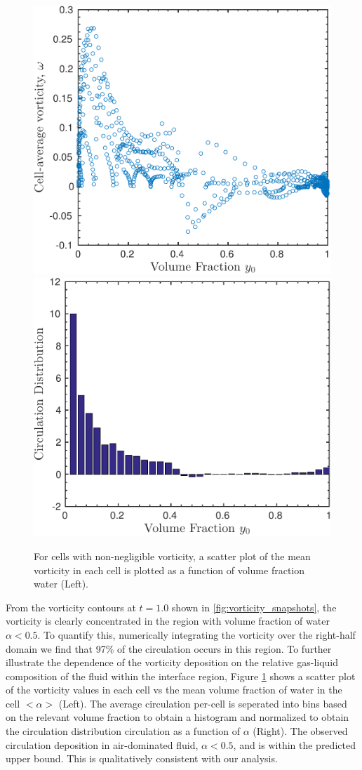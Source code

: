 \begin{figure}[h]
  \centering
  \includegraphics[width=.48\textwidth]{./figs/lung_figs/vorticity_vs_y0} \hfill
  \includegraphics[width=.48\textwidth]{./figs/lung_figs/circ_y0_dist2}
  \caption{For cells with non-negligible vorticity, a scatter plot of the mean vorticity in each cell is plotted as a function of volume fraction water (Left).  }
  \label{fig:baroclinic_y0_distribution}  
\end{figure}

From the vorticity contours at $t=1.0$ shown in
\ref{fig:vorticity_snapshots}, the vorticity is clearly concentrated
in the region with volume fraction of water $\alpha<0.5$. To quantify
this, numerically integrating the vorticity over the right-half domain
we find that 97\% of the circulation occurs in this region. To further
illustrate the dependence of the vorticity deposition on the relative
gas-liquid composition of the fluid within the interface region,
Figure \ref{fig:baroclinic_y0_distribution} shows a scatter plot of
the vorticity values in each cell vs the mean volume fraction of water
in the cell $<\alpha>$ (Left). The average circulation per-cell is
seperated into bins based on the relevant volume fraction to obtain a
histogram and normalized to obtain the circulation distribution
circulation as a function of $\alpha$ (Right). The observed circulation
deposition in air-dominated fluid, $\alpha<0.5$, and is within the
predicted upper bound. This is qualitatively consistent with our
analysis.
% 
% 
